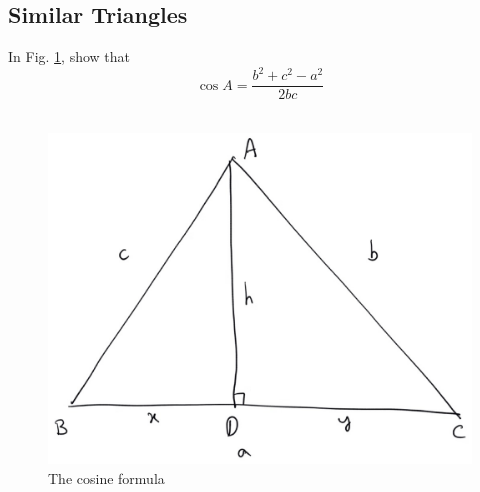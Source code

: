 \subsection{Similar Triangles}
\begin{problem}
In Fig. \ref{ch2_cosine_formula}, show that
%
\begin{equation}
\cos A = \frac{b^2+c^2-a^2}{2bc}
\end{equation}
%
\
\end{problem}
\begin{figure}[!h]
	\begin{center}
		
		\includegraphics[width=\columnwidth]{./figs/ch2_triang_ar}
		\vspace*{-10cm}
	\end{center}
	\caption{The cosine formula}
	\label{ch2_cosine_formula}	
\end{figure}

